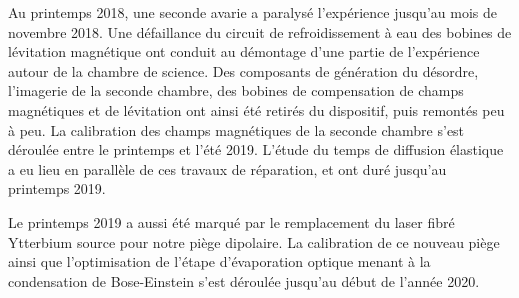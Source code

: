 Au printemps 2018, une seconde avarie a paralysé l'expérience jusqu'au mois de novembre 2018. Une défaillance du circuit de refroidissement à eau des bobines de lévitation magnétique ont conduit au démontage d'une partie de l'expérience autour de la chambre de science. Des composants de génération du désordre, l'imagerie de la seconde chambre, des bobines de compensation de champs magnétiques et de lévitation ont ainsi été retirés du dispositif, puis remontés peu à peu. La calibration des champs magnétiques de la seconde chambre s'est déroulée entre le printemps et l'été 2019. L'étude du temps de diffusion élastique a eu lieu en parallèle de ces travaux de réparation, et ont duré jusqu'au printemps 2019.

Le printemps 2019 a aussi été marqué par le remplacement du laser fibré Ytterbium source pour notre piège dipolaire. La calibration de ce nouveau piège ainsi que l'optimisation de l'étape d'évaporation optique menant à la condensation de Bose-Einstein s'est déroulée jusqu'au début de l'année 2020. 





